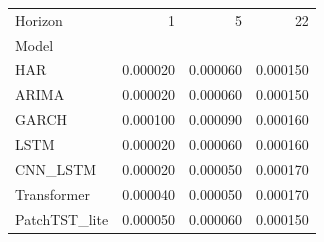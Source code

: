 \begin{tabular}{lrrr}
\toprule
Horizon & 1 & 5 & 22 \\
Model &  &  &  \\
\midrule
HAR & 0.000020 & 0.000060 & 0.000150 \\
ARIMA & 0.000020 & 0.000060 & 0.000150 \\
GARCH & 0.000100 & 0.000090 & 0.000160 \\
LSTM & 0.000020 & 0.000060 & 0.000160 \\
CNN_LSTM & 0.000020 & 0.000050 & 0.000170 \\
Transformer & 0.000040 & 0.000050 & 0.000170 \\
PatchTST_lite & 0.000050 & 0.000060 & 0.000150 \\
\bottomrule
\end{tabular}
